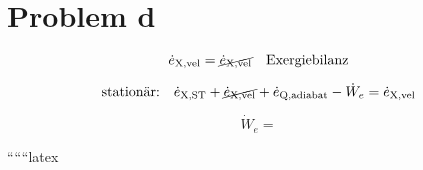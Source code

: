 \section*{Problem d}

\[
\dot{e}_{\text{X,vel}} = \cancel{\dot{e}_{\text{X,vel}}} \quad \text{Exergiebilanz}
\]

\[
\text{stationär:} \quad \dot{e}_{\text{X,ST}} + \cancel{\dot{e}_{\text{X,vel}}} + \dot{e}_{\text{Q,adiabat}} - \dot{W}_e = \dot{e}_{\text{X,vel}}
\]

\[
\dot{W}_e =
\]

``````latex